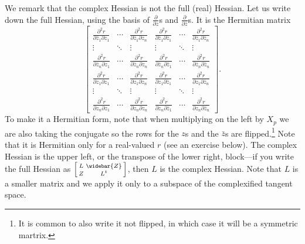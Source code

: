 \documentclass[12pt,openany]{book}
\theoremstyle{plain}
\theoremstyle{remark}
\theoremstyle{definition}
\theoremstyle{exercise}
\theoremstyle{example}
\begin{document}
We remark that the complex Hessian is not the full (real) Hessian.
Let us write down the full Hessian, using the
basis of $\frac{\partial}{\partial z}$s and
$\frac{\partial}{\partial \bar{z}}$s.  It is
the Hermitian matrix
\begin{equation*}
\begin{bmatrix}
\frac{\partial^2 r}{\partial \bar{z}_1 \partial z_1}
& \cdots &
\frac{\partial^2 r}{\partial \bar{z}_1 \partial z_n}
&
\frac{\partial^2 r}{\partial \bar{z}_1 \partial \bar{z}_1}
& \cdots &
\frac{\partial^2 r}{\partial \bar{z}_1 \partial \bar{z}_n}
\\
\vdots & \ddots & \vdots & \vdots & \ddots & \vdots
\\
\frac{\partial^2 r}{\partial \bar{z}_n \partial z_1}
& \cdots &
\frac{\partial^2 r}{\partial \bar{z}_n \partial z_n}
&
\frac{\partial^2 r}{\partial \bar{z}_n \partial \bar{z}_1}
& \cdots &
\frac{\partial^2 r}{\partial \bar{z}_n \partial \bar{z}_n}
\\
\frac{\partial^2 r}{\partial z_1 \partial z_1}
& \cdots &
\frac{\partial^2 r}{\partial z_1 \partial z_n}
&
\frac{\partial^2 r}{\partial z_1 \partial \bar{z}_1}
& \cdots &
\frac{\partial^2 r}{\partial z_1 \partial \bar{z}_n}
\\
\vdots & \ddots & \vdots & \vdots & \ddots & \vdots
\\
\frac{\partial^2 r}{\partial z_n \partial z_1}
& \cdots &
\frac{\partial^2 r}{\partial z_n \partial z_n}
&
\frac{\partial^2 r}{\partial z_n \partial \bar{z}_1}
& \cdots &
\frac{\partial^2 r}{\partial z_n \partial \bar{z}_n}
\end{bmatrix}
.
\end{equation*}
To make it a Hermitian form, note that when multiplying on the left by $X_p$
we are also taking the conjugate so the rows for the $z$s and the $\bar{z}$s
are flipped.\footnote{It is common to also write it not flipped, in which case it
will be a symmetric martrix.}
Note that it is Hermitian only for a real-valued $r$ (see an exercise below).
The complex Hessian is the upper left,
or the transpose of the lower right, block---if you write the full Hessian as
$\Bigl[ \begin{smallmatrix} L & \widebar{Z} \\ Z & L^t \end{smallmatrix}
\Bigr]$, then $L$ is the complex Hessian.
Note that $L$ is a smaller matrix and we apply it only to a subspace
of the complexified tangent space.
\end{document}
